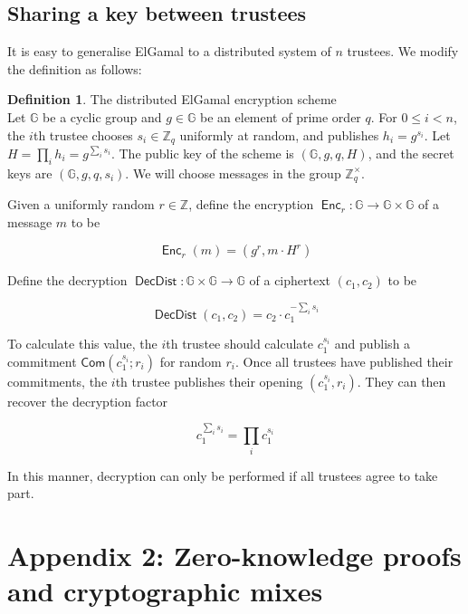 \documentclass[11pt,twoside,a4paper]{article}
\DeclareMathOperator{\Enc}{\mathsf{Enc}}
\DeclareMathOperator{\DecDist}{\mathsf{DecDist}}
\newcommand{\commit}{\mathsf{Com}}
\theoremstyle{definition}
\newtheorem{definition}{Definition}[section]
\begin{document}
\subsection{Sharing a key between trustees}
It is easy to generalise ElGamal to a distributed system of \(n\) trustees. We modify the definition as follows:
\begin{definition}{The distributed ElGamal encryption scheme}\\
    Let \(\mathbb{G}\) be a cyclic group and \(g\in\mathbb{G}\) be an element of prime order \(q\). For \(0\leq i<n\), the \(i\)th trustee chooses \(s_i\in\mathbb{Z}_q\) uniformly at random, and publishes \(h_i=g^{s_i}\). Let \(H=\prod_i h_i=g^{\sum_i s_i}\). The public key of the scheme is \((\mathbb{G}, g, q, H)\), and the secret keys are \((\mathbb{G}, g, q, s_i)\). We will choose messages in the group \(\mathbb{Z}^\times_q\).

    Given a uniformly random \(r\in\mathbb{Z}\), define the encryption \(\Enc_r:\mathbb{G}\rightarrow\mathbb{G}\times\mathbb{G}\) of a message \(m\) to be
    
    \[\Enc_r(m) = (g^r, m\cdot H^r)\]

    Define the decryption \(\DecDist:\mathbb{G}\times\mathbb{G}\rightarrow \mathbb{G}\) of a ciphertext \((c_1, c_2)\) to be
    
    \[\DecDist(c_1,c_2)=c_2\cdot c_1^{-\sum_i s_i}\]
    
    To calculate this value, the \(i\)th trustee should calculate \(c_1^{s_i}\) and publish a commitment \(\commit\left(c_1^{s_i};r_i\right)\) for random \(r_i\). Once all trustees have published their commitments, the \(i\)th trustee publishes their opening \(\left(c_1^{s_i}, r_i\right)\). They can then recover the decryption factor
    
    \[c_1^{\sum_i s_i}=\prod_i{c_1^{s_i}}\]
\end{definition}
In this manner, decryption can only be performed if all trustees agree to take part.
\vfill\pagebreak
\section{Appendix 2: Zero-knowledge proofs and cryptographic mixes}\label{app-proof}
\end{document}
